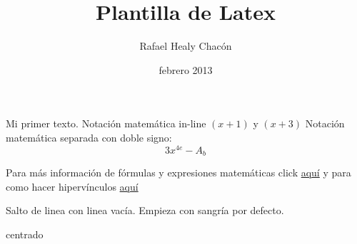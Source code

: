 \documentclass[12pt]{article}
\title{Plantilla de Latex}
\author{Rafael Healy Chacón}
\date{febrero 2013}
\begin{document}
\maketitle
Mi primer texto. Notación matemática in-line $(x+1)$ y $(x+3)$ Notación matemática separada con doble signo: $$3x^{4e} - A_b$$

Para más información de fórmulas y expresiones matemáticas click \href{http://en.wikibooks.org/wiki/LaTeX/Mathematics}{aquí} y para como hacer hipervínculos \href{http://en.wikibooks.org/wiki/LaTeX/Hyperlinks}{aquí}

Salto de linea con linea vacía. Empieza con sangría por defecto.
\begin{center}
centrado %
\end{center}
\end{document}
